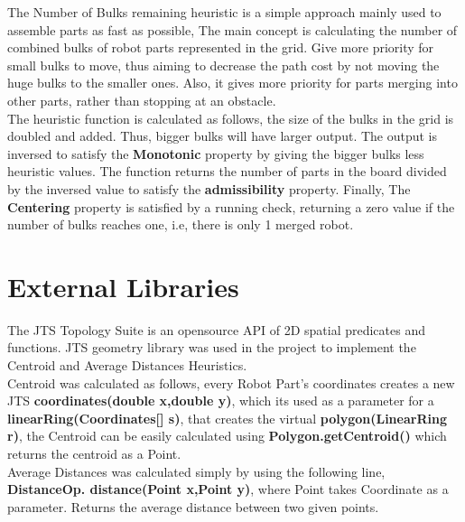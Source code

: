 The Number of Bulks remaining heuristic is a simple approach mainly used to assemble parts as fast as possible, The main concept is calculating the number of combined bulks of robot parts represented in the grid. Give more priority for small bulks to move, thus aiming to decrease the path cost by not moving the huge bulks to the smaller ones. Also, it gives more priority for parts merging into other parts, rather than stopping at an obstacle.  \\

The heuristic function is calculated as follows, the size of the bulks in the grid is doubled and added. Thus, bigger bulks will have larger output. The output is inversed to satisfy the \textbf{Monotonic} property by giving the bigger bulks less heuristic values. The function returns the number of parts in the board divided by the inversed value to satisfy the \textbf{admissibility} property. Finally, The \textbf{Centering} property is satisfied by a running check, returning a zero value if the number of bulks reaches one, i.e, there is only 1 merged robot.


\chapter{External Libraries}

The JTS Topology Suite is an opensource API of 2D spatial predicates and functions. JTS geometry library was used in the project to implement the Centroid and Average Distances Heuristics. \\

 Centroid was calculated as follows, every Robot Part's coordinates creates a new JTS \textbf{coordinates(double x,double y)}, which its used as a parameter for a \textbf{linearRing(Coordinates[] s)}, that creates the virtual \textbf{polygon(LinearRing r)}, the Centroid can be easily calculated using \textbf{Polygon.getCentroid()} which returns the centroid as a Point.\\
 
 Average Distances was calculated simply by using the following line, \textbf{DistanceOp. distance(Point x,Point y)}, where Point takes Coordinate as a parameter. Returns the average distance between two given points.
 \\
 
 
 